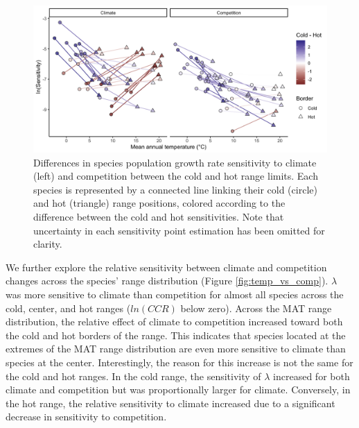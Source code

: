 \hypertarget{fig:cold_vs_hot}{%
\begin{figure}
\centering
\includegraphics[width=1\textwidth,height=\textheight]{manuscript/figs/fig-hot_vs_cold-1.png}
\caption[{Differences in species population growth rate sensitivity to
climate (left) and competition between the cold and hot range
limits.}]{Differences in species population growth rate sensitivity to
climate (left) and competition between the cold and hot range limits.
Each species is represented by a connected line linking their cold
(circle) and hot (triangle) range positions, colored according to the
difference between the cold and hot sensitivities. Note that uncertainty
in each sensitivity point estimation has been omitted for clarity.}
\label{fig:cold_vs_hot}
\end{figure}
}

We further explore the relative sensitivity between climate and
competition changes across the species' range distribution (Figure
\ref{fig:temp_vs_comp}). \(\lambda\) was more sensitive to climate than
competition for almost all species across the cold, center, and hot
ranges (\(ln(CCR)\) below zero). Across the MAT range distribution, the
relative effect of climate to competition increased toward both the cold
and hot borders of the range. This indicates that species located at the
extremes of the MAT range distribution are even more sensitive to
climate than species at the center. Interestingly, the reason for this
increase is not the same for the cold and hot ranges. In the cold range,
the sensitivity of \(\lambda\) increased for both climate and
competition but was proportionally larger for climate. Conversely, in
the hot range, the relative sensitivity to climate increased due to a
significant decrease in sensitivity to competition.\\

